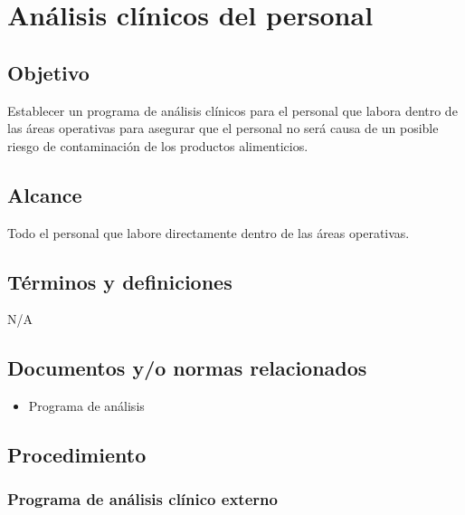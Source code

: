 \thispagestyle{formato-PI}
\renewcommand{\MayorVer}{2}
\renewcommand{\MenorVer}{0}
\renewcommand{\Codigo}{BPD-7-PROG}
\renewcommand{\FechaPub}{2023--01}
\renewcommand{\Titulo}{Análisis clínicos del personal}
\section{\Titulo}

\subsection{Objetivo}

Establecer un programa de análisis clínicos para el personal que labora dentro de las áreas operativas para asegurar que el personal no será causa de un posible riesgo de contaminación de los productos alimenticios.

\subsection{Alcance}

Todo el personal que labore directamente dentro de las áreas operativas.

\subsection{Términos y definiciones}

N/A

\subsection{Documentos y/o normas relacionados}

\begin{itemize}
	\item Programa de análisis
\end{itemize}

\subsection{Procedimiento}

\subsubsection{Programa de análisis clínico externo}

